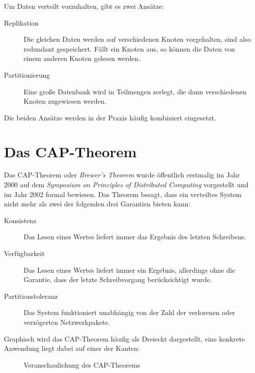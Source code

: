 \documentclass[a4paper,11pt]{scrartcl}
\begin{document}
  Um Daten verteilt vorzuhalten, gibt es zwei
  Ansätze:\cite[S.~147]{kleppmann17}

  \begin{description}
    \item[Replikation] Die gleichen Daten werden auf verschiedenen Knoten
      vorgehalten, sind also redundant gespeichert. Fällt ein Knoten aus, so
      können die Daten von einem anderen Knoten gelesen werden.
    \item[Partitionierung] Eine große Datenbank wird in Teilmengen zerlegt, die
      dann verschiedenen Knoten zugewiesen werden.
  \end{description}

  Die beiden Ansätze werden in der Praxis häufig kombiniert eingesetzt.

  \section{Das CAP-Theorem}
  Das CAP-Theorem oder \textit{Brewer's Theorem} wurde öffentlich erstmalig im
  Jahr 2000 auf dem \textit{Symposium on Principles of Distributed Computing}
  vorgestellt und im Jahr 2002 formal bewiesen. Das Theorem besagt, dass ein
  verteiltes System nicht mehr als zwei der folgenden drei Garantien bieten
  kann:\cite[S.~51-59]{brewer02}

  \begin{description}
    \item[Konsistenz] Das Lesen eines Wertes liefert immer das Ergebnis des
      letzten Schreibens.
    \item[Verfügbarkeit] Das Lesen eines Wertes liefert immer ein Ergebnis,
      allerdings ohne die Garantie, dass der letzte Schreibvorgang berücksichtigt
      wurde.
    \item[Partitionstoleranz] Das System funktioniert unabhängig von der Zahl der
      verlorenen oder verzögerten Netzwerkpakete.
  \end{description}

  Graphisch wird das CAP-Theorem häufig als Dreieckt dargestellt, eine konkrete
  Anwendung liegt dabei auf einer der Kanten:

  \begin{figure}[!h]
    \centering
    \caption{Veranschaulichung des CAP-Theorems}
  \end{figure}
\end{document}
